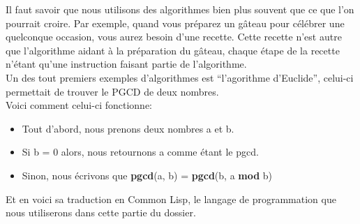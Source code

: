 \documentclass[a4paper, 12pt]{article}
\numberwithin{equation}{subsection}
\begin{document}
Il faut savoir que nous utilisons des algorithmes bien plus souvent que ce que l'on pourrait croire. Par exemple, quand vous préparez un gâteau pour célébrer une quelconque occasion, vous aurez besoin d'une recette. Cette recette n'est autre que l'algorithme aidant à la préparation du gâteau, chaque étape de la recette n'étant qu'une instruction faisant partie de l'algorithme. \\[0.2cm]
Un des tout premiers exemples d'algorithmes est ``l'agorithme d'Euclide'', celui-ci permettait de trouver le PGCD de deux nombres. \\
Voici comment celui-ci fonctionne: \\[0.2cm]
\begin{itemize}
  \item Tout d'abord, nous prenons deux nombres a et b.
  \item Si b = 0 alors, nous retournons a comme étant le pgcd.
  \item Sinon, nous écrivons que {\bf pgcd}(a, b) = {\bf pgcd}(b, a {\bf mod} b)\\[0.2cm]
\end{itemize}
Et en voici sa traduction en Common Lisp, le langage de programmation que nous utiliserons dans cette partie du dossier.

\end{document}

